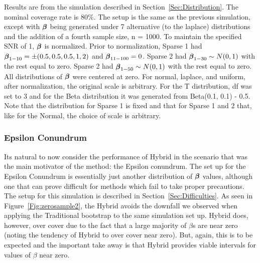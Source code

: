 \begin{table}[hbtp]
  \centering
  
  \caption{\label{Tab:dist_beta} Results are from the simulation described in Section~\ref{Sec:Distribution}. The nominal coverage rate is 80\%. The setup is the same as the previous simulation, except with $\boldsymbol{\beta}$ being generated under 7 alternative (to the laplace) distributions and the addition of a fourth sample size, n = 1000. To maintain the specified SNR of 1, $\boldsymbol{\beta}$ is normalized. Prior to normalization, Sparse 1 had $\boldsymbol{\beta}_{1-10} = \pm(0.5, 0.5, 0.5, 1, 2)$ and $\boldsymbol{\beta}_{11-100} = 0$. Sparse 2 had $\boldsymbol{\beta}_{1-30} \sim N(0, 1)$ with the rest equal to zero.  Sparse 2 had $\boldsymbol{\beta}_{1-50} \sim N(0, 1)$ with the rest equal to zero. All distributions of $\boldsymbol{\beta}$ were centered at zero. For normal, laplace, and uniform, after normalization, the original scale is arbitrary. For the T distribution, df was set to 3 and for the Beta distribution it was generated from Beta(0.1, 0.1) - 0.5. Note that the distribution for Sparse 1 is fixed and that for Sparse 1 and 2 that, like for the Normal, the choice of scale is arbitrary.}
\end{table}

\subsubsection{Epsilon Conundrum}\label{Sec:Epsilon}

Its natural to now consider the performance of Hybrid in the scenario that was the main motivator of the method: the Epsilon conundrum. The set up for the Epsilon Conundrum is essentially just another distribution of $\boldsymbol{\beta}$ values, although one that can prove difficult for methods which fail to take proper precautions. The setup for this simulation is described in Section~\ref{Sec:Difficulties}. As seen in Figure~\ref{Fig:zerosample2}, the Hybrid avoids the downfall we observed when applying the Traditional bootstrap to the same simulation set up. Hybrid does, however, over cover due to the fact that a large majority of $\beta$s are near zero (noting the tendency of Hybrid to over cover near zero). But, again, this is to be expected and the important take away is that Hybrid provides viable intervals for values of $\beta$ near zero.

